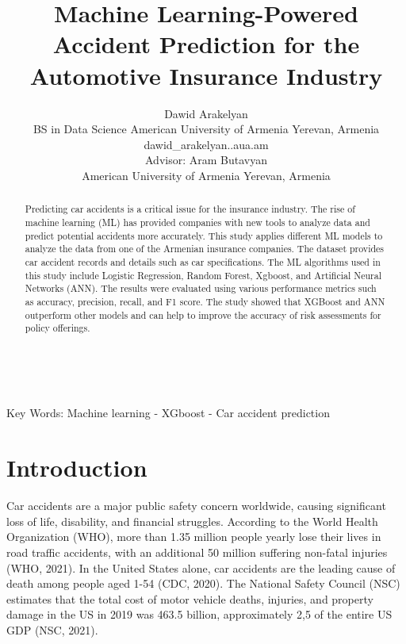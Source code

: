 \documentclass{IEEEtran}
\author{Dawid Arakelyan \\ BS in Data Science American University of Armenia Yerevan, Armenia\\ dawid\_arakelyan.\@edu.aua.am\\[1cm]{\small Advisor: Aram Butavyan\\ American University of Armenia Yerevan, Armenia}}
\title{Machine Learning-Powered Accident Prediction for the Automotive Insurance Industry}
\begin{document}
\maketitle





\tableofcontents

\ 

\begin{abstract}
Predicting car accidents is a critical issue for the insurance industry. The rise of machine learning (ML) has provided companies with new tools to analyze data and predict potential accidents more accurately. This study applies different  ML models to analyze the data from one of the Armenian insurance companies. The dataset provides car accident records and details such as car specifications. The ML algorithms used in this study include Logistic Regression, Random Forest, Xgboost, and Artificial Neural Networks (ANN). The results were evaluated using various performance metrics such as accuracy, precision, recall, and F1 score. The study showed that XGBoost and ANN outperform other models and can help to improve the accuracy of risk assessments for policy offerings.
\end{abstract}
{Key Words:}
Machine learning - XGboost -  Car accident prediction

\section{Introduction}

Car accidents are a major public safety concern worldwide, causing significant loss of life, disability, and financial struggles. According to the World Health Organization (WHO), more than 1.35 million people yearly lose their lives in road traffic accidents, with an additional 50 million suffering non-fatal injuries (WHO, 2021). In the United States alone, car accidents are the leading cause of death among people aged 1-54 (CDC, 2020). The National Safety Council (NSC) estimates that the total cost of motor vehicle deaths, injuries, and property damage in the US in 2019 was \text{\$}463.5 billion, approximately 2,5 \text{\%} of the entire US GDP (NSC, 2021). 
\end{document}
